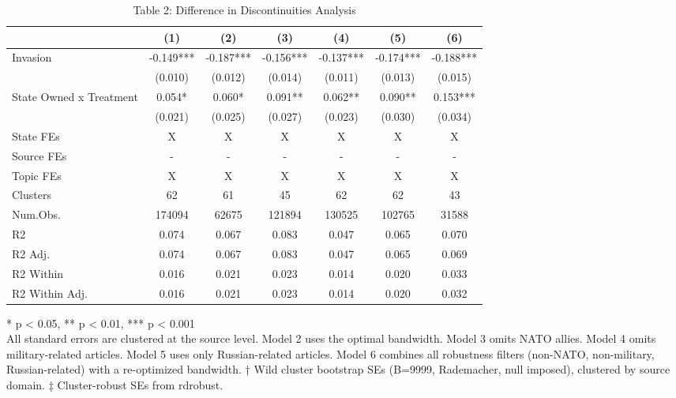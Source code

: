 \begin{table}[!t]
\caption{Table 2: Difference in Discontinuities Analysis} 
\fontsize{12.0pt}{14.4pt}\selectfont
\begin{tabular*}{\linewidth}{@{\extracolsep{\fill}}lcccccc}
\toprule
  & (1) & (2) & (3) & (4) & (5) & (6) \\ 
\midrule\addlinespace[2.5pt]
Invasion & -0.149*** & -0.187*** & -0.156*** & -0.137*** & -0.174*** & -0.188*** \\ 
 & (0.010) & (0.012) & (0.014) & (0.011) & (0.013) & (0.015) \\ 
State Owned x Treatment & 0.054* & 0.060* & 0.091** & 0.062** & 0.090** & 0.153*** \\ 
{} & {(0.021)} & {(0.025)} & {(0.027)} & {(0.023)} & {(0.030)} & {(0.034)} \\ 
State FEs & X & X & X & X & X & X \\ 
Source FEs & - & - & - & - & - & - \\ 
Topic FEs & X & X & X & X & X & X \\ 
Clusters & 62 & 61 & 45 & 62 & 62 & 43 \\ 
Num.Obs. & 174094 & 62675 & 121894 & 130525 & 102765 & 31588 \\ 
R2 & 0.074 & 0.067 & 0.083 & 0.047 & 0.065 & 0.070 \\ 
R2 Adj. & 0.074 & 0.067 & 0.083 & 0.047 & 0.065 & 0.069 \\ 
R2 Within & 0.016 & 0.021 & 0.023 & 0.014 & 0.020 & 0.033 \\ 
R2 Within Adj. & 0.016 & 0.021 & 0.023 & 0.014 & 0.020 & 0.032 \\ 
\bottomrule
\end{tabular*}
\begin{minipage}{\linewidth}
* p < 0.05, ** p < 0.01, *** p < 0.001\\
All standard errors are clustered at the source level. Model 2 uses the optimal
bandwidth. Model 3 omits NATO allies. Model 4 omits military-related articles.
Model 5 uses only Russian-related articles. Model 6 combines all robustness
filters (non-NATO, non-military, Russian-related) with a re-optimized bandwidth.
† Wild cluster bootstrap SEs (B=9999, Rademacher, null imposed), clustered by
source domain. ‡ Cluster-robust SEs from rdrobust.\\
\end{minipage}
\end{table}

